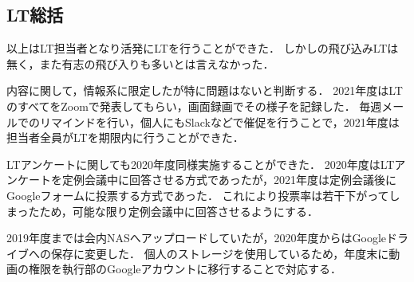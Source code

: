\subsection*{LT総括}


\secondGrade{}以上はLT担当者となり活発にLTを行うことができた．
しかし\firstGrade{}の飛び込みLTは無く，また有志の飛び入りも多いとは言えなかった．

内容に関して，情報系に限定したが特に問題はないと判断する．
2021年度はLTのすべてをZoomで発表してもらい，画面録画でその様子を記録した．
毎週メールでのリマインドを行い，個人にもSlackなどで催促を行うことで，2021年度は担当者全員がLTを期限内に行うことができた．

LTアンケートに関しても2020年度同様実施することができた．
2020年度はLTアンケートを定例会議中に回答させる方式であったが，2021年度は定例会議後にGoogleフォームに投票する方式であった．
これにより投票率は若干下がってしまったため，可能な限り定例会議中に回答させるようにする．

2019年度までは会内NASへアップロードしていたが，2020年度からはGoogleドライブへの保存に変更した．
個人のストレージを使用しているため，年度末に動画の権限を執行部のGoogleアカウントに移行することで対応する．

